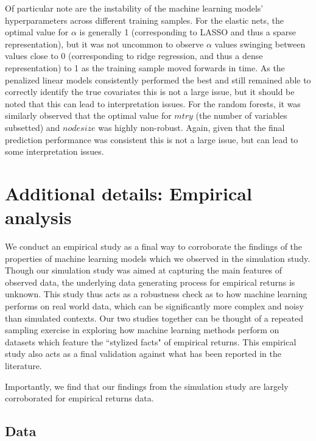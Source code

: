 \documentclass{article}
\begin{document}
Of particular note are the instability of the machine learning models' hyperparameters across different training samples. For the elastic nets, the optimal value for $\alpha$ is generally 1 (corresponding to LASSO and thus a sparse representation), but it was not uncommon to observe $\alpha$ values swinging between values close to 0 (corresponding to ridge regression, and thus a dense representation) to 1 as the training sample moved forwards in time. As the penalized linear models consistently performed the best and still remained able to correctly identify the true covariates this is not a large issue, but it should be noted that this can lead to interpretation issues. For the random forests, it was similarly observed that the optimal value for $mtry$ (the number of variables subsetted) and $nodesize$ was highly non-robust. Again, given that the final prediction performance was consistent this is not a large issue, but can lead to some interpretation issues.

\appendix

\section{Additional details: Empirical analysis}

We conduct an empirical study as a final way to corroborate the findings of the properties of machine learning models which we observed in the simulation study. Though our simulation study was aimed at capturing the main features of observed data, the underlying data generating process for empirical returns is unknown. This study thus acts as a robustness check as to how machine learning performs on real world data, which can be significantly more complex and noisy than simulated contexts. Our two studies together can be thought of a repeated sampling exercise in exploring how machine learning methods perform on datasets which feature the ``stylized facts" of empirical returns. This empirical study also acts as a final validation against what has been reported in the literature.

Importantly, we find that our findings from the simulation study are largely corroborated for empirical returns data.

\subsection{Data}
\end{document}
